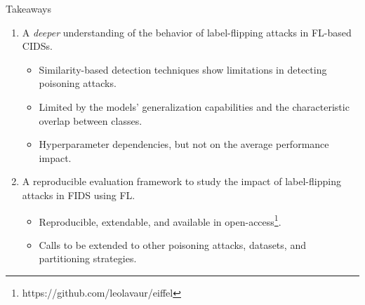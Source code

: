 \begin{frame}{Takeaways}
  \begin{enumerate}
    \item A \emph{deeper} understanding of the behavior of label-flipping attacks in FL-based CIDSs.
    \begin{itemize}\small
      \item Similarity-based detection techniques show limitations in detecting poisoning attacks.
      \item Limited by the models' generalization capabilities and the characteristic overlap between classes.
      \item Hyperparameter dependencies, but not on the average performance impact.
    \end{itemize}

    \pause
    \item A \alert{reproducible} evaluation framework to study the impact of label-flipping attacks in FIDS using FL.
    \begin{itemize}\small
      \item Reproducible, extendable, and available in open-access\footnote<+>{https://github.com/leolavaur/eiffel}.
      \item Calls to be extended to other poisoning attacks, datasets, and partitioning strategies.
    \end{itemize}
  \end{enumerate}
  


\end{frame}





